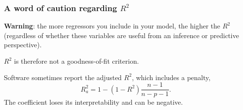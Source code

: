 \documentclass{beamer}
\begin{document}
 \begin{frame}
 \frametitle{A word of caution regarding $R^2$}
 \bi 
 \item 
 \textbf{Warning}: the more regressors you include in your model, the higher the $R^2$ (regardless of whether these variables are useful from an inference or predictive perspective).
  \item $R^2$ is therefore not a goodness-of-fit criterion.
  \item Software sometimes report the adjusted $R^2$,  which includes a penalty, \[R^2_a=1-(1-R^{2})\frac{n-1}{n-p-1}.\] The coefficient loses its interpretability and can be negative.
  \ei
  
  \end{frame}
  
\end{document}
